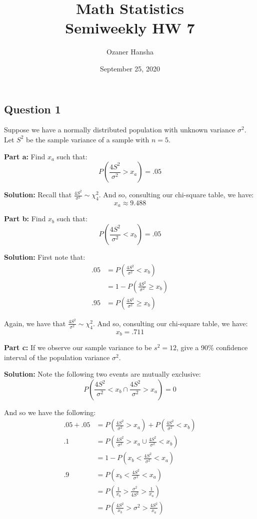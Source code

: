 \documentclass{article}
\begin{document}
\title{Math Statistics\\ Semiweekly HW 7}
\author{Ozaner Hansha}
\date{September 25, 2020}
\maketitle

\subsection*{Question 1}
Suppose we have a normally distributed population with unknown variance $\sigma^2$. Let $S^2$ be the sample variance of a sample with $n=5$.
\bigskip

\noindent\textbf{Part a:} Find $x_a$ such that:
$$P\left(\frac{4S^2}{\sigma^2}>x_a\right)=.05$$
\smallskip

\noindent\textbf{Solution:} Recall that $\frac{4S^2}{\sigma^2}\sim \chi^2_4$. And so, consulting our chi-square table, we have:
$$x_a\approx9.488$$
\smallskip

\noindent\textbf{Part b:} Find $x_b$ such that:
$$P\left(\frac{4S^2}{\sigma^2}<x_b\right)=.05$$
\smallskip

\noindent\textbf{Solution:} First note that:
\begin{align*}
    .05&=P\left(\frac{4S^2}{\sigma^2}<x_b\right)\\
    &=1-P\left(\frac{4S^2}{\sigma^2}\ge x_b\right)\tag{complement}\\
    .95&=P\left(\frac{4S^2}{\sigma^2}\ge x_b\right)
\end{align*}


Again, we have that $\frac{4S^2}{\sigma^2}\sim \chi^2_4$. And so, consulting our chi-square table, we have:
$$x_b=.711$$
\smallskip

\noindent\textbf{Part c:} If we observe our sample variance to be $s^2=12$, give a 90\% confidence interval of the population variance $\sigma^2$.
\bigskip

\noindent\textbf{Solution:} Note the following two events are mutually exclusive:
$$P\left(\frac{4S^2}{\sigma^2}<x_b\cap\frac{4S^2}{\sigma^2}>x_a\right)=0$$

And so we have the following:
\begin{align*}
    .05+.05&=P\left(\frac{4S^2}{\sigma^2}>x_a\right)+P\left(\frac{4S^2}{\sigma^2}<x_b\right)\\
    .1&=P\left(\frac{4S^2}{\sigma^2}>x_a\cup\frac{4S^2}{\sigma^2}<x_b\right)\tag{mutually exclusive}\\
    &=1-P\left(x_b<\frac{4S^2}{\sigma^2}<x_a\right)\tag{complement \& deMorgan}\\
    .9&=P\left(x_b<\frac{4S^2}{\sigma^2}<x_a\right)\\
    &=P\left(\frac{1}{x_b}>\frac{\sigma^2}{4S^2}>\frac{1}{x_a}\right)\tag{$\sigma^2,S^2,x_a,x_b$ are positive}\\
    &=P\left(\frac{4S^2}{x_b}>\sigma^2>\frac{4S^2}{x_a}\right)
\end{align*}
\end{document}
